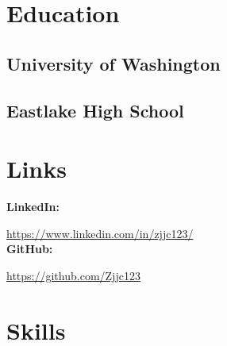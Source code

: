 \documentclass[]{main}
\begin{document}
%
%

%
%

%
%

\begin{minipage}[t]{0.33\textwidth} 


\section{Education} 

\subsection{University of Washington}
\sectionsep

\subsection{Eastlake High School}
\sectionsep


\section{Links} 
\textbf{LinkedIn:} 

\href{https://www.linkedin.com/in/zjjc123/}{https://www.linkedin.com/in/zjjc123/} \\
\textbf{GitHub:} 

\href{https://github.com/Zjjc123}{https://github.com/Zjjc123} \\



\section{Skills}


\end{minipage}
\end{document}
